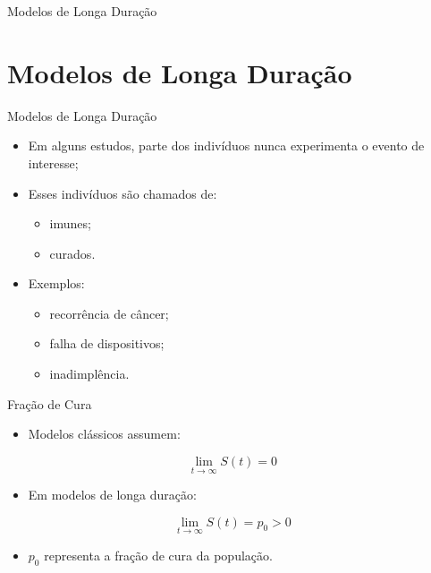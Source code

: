 \documentclass[aspectratio=169,t,xcolor=table]{beamer}
\begin{document}
\begin{frame}{Modelos de Longa Duração}
\end{frame}

\section{Modelos de Longa Duração}

\begin{frame}{Modelos de Longa Duração}

\begin{itemize}
\item Em alguns estudos, parte dos indivíduos nunca experimenta o evento de interesse;

\vspace{0.3cm}

\item Esses indivíduos são chamados de:
\begin{itemize}
    \item imunes;
    \item curados.
\end{itemize}

\vspace{0.3cm}

\item Exemplos:
\begin{itemize}
    \item recorrência de câncer;
    \item falha de dispositivos;
    \item inadimplência.
\end{itemize}

\end{itemize}

\end{frame}

\begin{frame}{Fração de Cura}

\begin{itemize}
\item Modelos clássicos assumem:
\end{itemize}

$$
\lim_{t\to\infty} S(t)=0
$$

\vspace{0.4cm}

\begin{itemize}
\item Em modelos de longa duração:
\end{itemize}

$$
\lim_{t\to\infty} S(t)=p_0>0
$$

\vspace{0.4cm}

\begin{itemize}
\item $p_0$ representa a fração de cura da população.
\end{itemize}

\end{frame}
\end{document}
